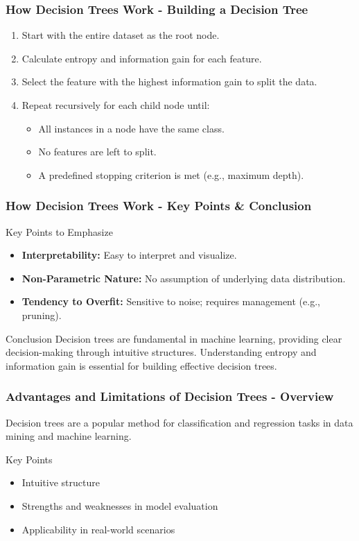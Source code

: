 \documentclass[aspectratio=169]{beamer}
\begin{document}
\begin{frame}[fragile]
    \frametitle{How Decision Trees Work - Building a Decision Tree}
    \begin{enumerate}
        \item Start with the entire dataset as the root node.
        \item Calculate entropy and information gain for each feature.
        \item Select the feature with the highest information gain to split the data.
        \item Repeat recursively for each child node until:
        \begin{itemize}
            \item All instances in a node have the same class.
            \item No features are left to split.
            \item A predefined stopping criterion is met (e.g., maximum depth).
        \end{itemize}
    \end{enumerate}  
\end{frame}

\begin{frame}[fragile]
    \frametitle{How Decision Trees Work - Key Points & Conclusion}
    \begin{block}{Key Points to Emphasize}
        \begin{itemize}
            \item \textbf{Interpretability:} Easy to interpret and visualize.
            \item \textbf{Non-Parametric Nature:} No assumption of underlying data distribution.
            \item \textbf{Tendency to Overfit:} Sensitive to noise; requires management (e.g., pruning).
        \end{itemize}
    \end{block}
    \begin{block}{Conclusion}
        Decision trees are fundamental in machine learning, providing clear decision-making through intuitive structures. Understanding entropy and information gain is essential for building effective decision trees.
    \end{block}
\end{frame}

\begin{frame}[fragile]
    \frametitle{Advantages and Limitations of Decision Trees - Overview}
    Decision trees are a popular method for classification and regression tasks in data mining and machine learning.
    
    \begin{block}{Key Points}
        \begin{itemize}
            \item Intuitive structure
            \item Strengths and weaknesses in model evaluation
            \item Applicability in real-world scenarios
        \end{itemize}
    \end{block}
\end{frame}
\end{document}
